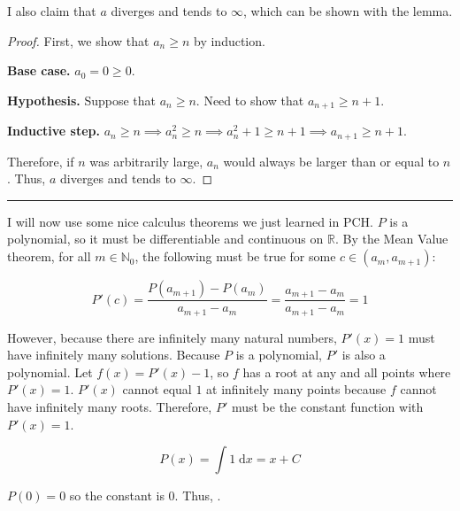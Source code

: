 \documentclass{article}
\newcommand*{\iinteg}[2][x]{\ensuremath{\displaystyle\int #2\;\mathrm{d}#1}}
\begin{document}
I also claim that $a$ diverges and tends to $\infty$, which can be shown with the lemma.

\begin{proof}
	First, we show that $a_n\geq n$ by induction.

	\textbf{Base case.} $a_0=0\geq0$.

	\textbf{Hypothesis.} Suppose that $a_n\geq n$. Need to show that $a_{n+1}\geq n+1$.

	\textbf{Inductive step.} $a_n\geq n \implies a_n^2\geq n \implies a_n^2+1\geq n+1 \implies a_{n+1}\geq n+1$.

	Therefore, if $n$ was arbitrarily large, $a_n$ would always be larger than or equal to $n$. Thus, $a$ diverges and tends to $\infty$.	
\end{proof}

\vspace*{-8pt}
\rule{\textwidth}{0.1pt}

I will now use some nice calculus theorems we just learned in PCH. $P$ is a polynomial, so it must be differentiable and continuous on $\mathbb{R}$. By the Mean Value theorem, for all $m\in\mathbb{N}_0$, the following must be true for some $c\in(a_m,a_{m+1})$:

\begin{equation*}
	P'(c)=\frac{P(a_{m+1})-P(a_m)}{a_{m+1}-a_m}=\frac{a_{m+1}-a_m}{a_{m+1}-a_m}=1
\end{equation*}

However, because there are infinitely many natural numbers, $P'(x)=1$ must have infinitely many solutions. Because $P$ is a polynomial, $P'$ is also a polynomial. Let $f(x)=P'(x)-1$, so $f$ has a root at any and all points where $P'(x)=1$. $P'(x)$ cannot equal $1$ at infinitely many points because $f$ cannot have infinitely many roots. Therefore, $P'$ must be the constant function with $P'(x)=1$.

\begin{equation*}
	P(x)=\iinteg{1}=x+C
\end{equation*}

$P(0)=0$ so the constant is $0$. Thus, .
\end{document}
